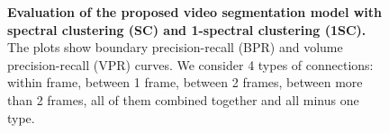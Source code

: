 \begin{figure}[htbp]
\begin{minipage}[t]{1\textwidth}
\setcounter{subfigure}{0}
\quad 
{} 
\end{minipage}

\caption[Evaluation of the proposed video segmentation model with spectral clustering (SC) and 1-spectral clustering (1SC)]{
{\bf Evaluation of the proposed video segmentation model with spectral clustering (SC) and 1-spectral clustering (1SC).}
The plots show boundary precision-recall (BPR) and volume precision-recall (VPR) curves. We consider 4 types of connections: within frame, 
between 1 frame, between 2 frames, between more than 2 frames, all of them combined together and all minus one type.}
\label{fig:ml_1sc}
\end{figure}

